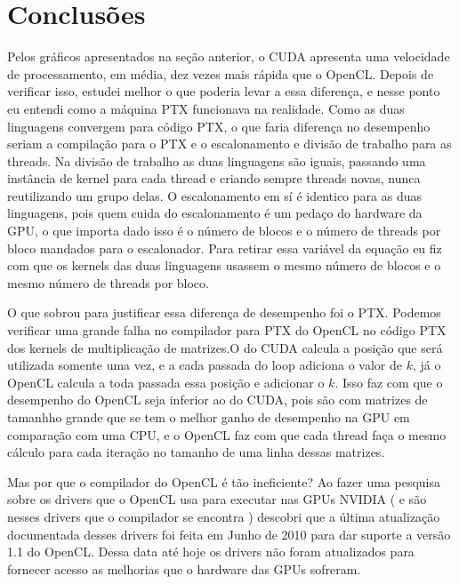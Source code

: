 \section{Conclusões}
Pelos gráficos apresentados na seção anterior, o CUDA apresenta uma velocidade de processamento, em média, dez vezes mais rápida que o OpenCL.
Depois de verificar isso, estudei melhor o que poderia levar a essa diferença, e nesse ponto eu entendi como a máquina PTX funcionava 
na realidade. Como as duas linguagens convergem para código PTX, o que faria diferença no desempenho seriam
a compilação para o PTX e o escalonamento e divisão de trabalho para as threads. Na divisão de trabalho as duas linguagens
são iguais, passando uma instância de kernel para cada thread e criando sempre threads novas, nunca reutilizando um grupo delas.
O escalonamento em sí é identico para as duas linguagens, pois quem cuida do escalonamento é um pedaço do hardware da GPU, o que
importa dado isso é o número de blocos e o número de threads por bloco mandados para o escalonador. Para retirar essa variável da equação
eu fiz com que os kernels das duas linguagens usassem o mesmo número de blocos e o mesmo número de threads por bloco.

O que sobrou para justificar essa diferença de desempenho foi o PTX. Podemos verificar uma grande falha no compilador para PTX do OpenCL
no código PTX dos kernels de multiplicação de matrizes.O do CUDA calcula a posição que será utilizada somente uma vez, e a cada passada
do loop adiciona o valor de $k$, já o OpenCL calcula a toda passada essa posição e adicionar o $k$. Isso faz com que o desempenho do
OpenCL seja inferior ao do CUDA, pois são com matrizes de tamanhho grande que se tem o melhor ganho de desempenho na GPU em comparação
com uma CPU, e o OpenCL faz com que cada thread faça o mesmo cálculo para cada iteração no tamanho de uma linha dessas matrizes.

Mas por que o compilador do OpenCL é tão ineficiente? Ao fazer uma pesquisa sobre os drivers que o OpenCL usa para executar nas GPUs NVIDIA
( e são nesses drivers que o compilador se encontra ) descobri que a última atualização documentada desses drivers foi feita em Junho de 2010
para dar suporte a versão 1.1 do OpenCL. Dessa data até hoje os drivers não foram atualizados para fornecer acesso as melhorias que o hardware
das GPUs sofreram.
